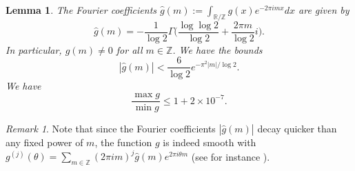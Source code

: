 \documentclass[11pt,reqno]{amsart}
\numberwithin{equation}{section}
\newtheorem{lemma}[theorem]{Lemma}
\theoremstyle{definition}
\theoremstyle{remark}
\newtheorem*{remark}{Remark}
\newcommand{\wh}{\widehat}
\renewcommand{\le}{\leqslant}
\newcommand\Z{\mathbb{Z}}
\newcommand\R{\mathbb{R}}
\begin{document}
\begin{lemma}
The Fourier coefficients $\wh{g}(m) := \int_{\R/\Z} g(x) e^{-2\pi i m x} dx$ are given by
\begin{equation}\label{g-fourier-formula}
\wh{g}(m) = {-}\frac{1}{\log 2} \Gamma \big( \frac{\log \log 2}{\log 2} + \frac{2\pi m}{\log 2}i\big).
\end{equation}
In particular, $\wh{g}(m) \ne 0$ for all $m \in \Z$. We have the bounds
\begin{equation}\label{g-fourier-bound} |\wh{g}(m)| < \frac{6}{\log 2} e^{-\pi^2 |m|/\log 2}.\end{equation}
We have
\begin{equation}\label{g-ratio-bd}
\frac{\max g}{\min g} \le 1 + 2 \times 10^{-7}.
\end{equation}
\end{lemma}
\begin{remark}
Note that since the Fourier coefficients $|\wh{g}(m)|$ decay quicker than any fixed power of $m$, the function $g$ is indeed smooth with $g^{(j)}(\theta) = \sum_{m \in \Z} (2 \pi i m)^j \widehat{g}(m) e^{2\pi i \theta m}$ (see for instance \cite[Proposition 3.3.12]{grafakos}).
\end{remark}
\end{document}
